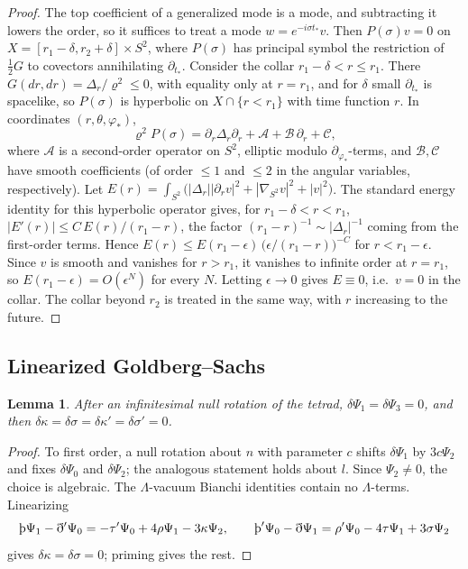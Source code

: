 \documentclass[11pt]{amsart}
\newtheorem{lemma}[theorem]{Lemma}
\theoremstyle{definition}
\theoremstyle{remark}
\numberwithin{equation}{section}
\newcommand{\Th}{\text{\th}}
\begin{document}
\begin{proof}
The top coefficient of a generalized mode is a mode, and subtracting it lowers the order, so it suffices to treat a
mode $w=e^{-i\sigma t_*}v$. Then $P(\sigma)v=0$ on $X=[r_1-\delta,r_2+\delta]\times S^2$, where $P(\sigma)$ has principal
symbol the restriction of $\frac12G$ to covectors annihilating $\partial_{t_*}$. Consider the collar $r_1-\delta<r\le r_1$.
There $G(dr,dr)=\Delta_r/\varrho^2\le0$, with equality only at $r=r_1$, and for $\delta$ small $\partial_{t_*}$ is spacelike,
so $P(\sigma)$ is hyperbolic on $X\cap\{r<r_1\}$ with time function $r$. In coordinates $(r,\theta,\varphi_*)$,
\[
\varrho^2P(\sigma)=\partial_r\Delta_r\partial_r+\mathcal A+\mathcal B\,\partial_r+\mathcal C,
\]
where $\mathcal A$ is a second-order operator on $S^2$, elliptic modulo $\partial_{\varphi_*}$-terms, and $\mathcal B,\mathcal C$
have smooth coefficients (of order $\le1$ and $\le2$ in the angular variables, respectively). Let
$E(r)=\int_{S^2}\big(|\Delta_r||\partial_rv|^2+|\nabla_{S^2}v|^2+|v|^2\big)$. The standard energy identity for this
hyperbolic operator gives, for $r_1-\delta<r<r_1$,
$|E'(r)|\le C\,E(r)/(r_1-r)$, the factor $(r_1-r)^{-1}\sim|\Delta_r|^{-1}$ coming from the first-order terms. Hence
$E(r)\le E(r_1-\epsilon)\,\big(\epsilon/(r_1-r)\big)^{-C}$ for $r<r_1-\epsilon$. Since $v$ is smooth and vanishes for
$r>r_1$, it vanishes to infinite order at $r=r_1$, so $E(r_1-\epsilon)=O(\epsilon^N)$ for every $N$. Letting
$\epsilon\to0$ gives $E\equiv0$, i.e.\ $v=0$ in the collar. The collar beyond $r_2$ is treated in the same way, with
$r$ increasing to the future.
\end{proof}

\subsection{Linearized Goldberg--Sachs}
\begin{lemma}\label{lem:GS}
After an infinitesimal null rotation of the tetrad, $\delta\Psi_1=\delta\Psi_3=0$, and then
$\delta\kappa=\delta\sigma=\delta\kappa'=\delta\sigma'=0$.
\end{lemma}
\begin{proof}
To first order, a null rotation about $n$ with parameter $c$ shifts $\delta\Psi_1$ by $3c\Psi_2$ and fixes
$\delta\Psi_0$ and $\delta\Psi_2$; the analogous statement holds about $l$. Since $\Psi_2\ne0$, the choice is
algebraic. The $\Lambda$-vacuum Bianchi identities contain no $\Lambda$-terms. Linearizing
\[
\Th\Psi_1-\eth'\Psi_0=-\tau'\Psi_0+4\rho\Psi_1-3\kappa\Psi_2,\qquad
\Th'\Psi_0-\eth\Psi_1=\rho'\Psi_0-4\tau\Psi_1+3\sigma\Psi_2
\]
gives $\delta\kappa=\delta\sigma=0$; priming gives the rest.
\end{proof}
\end{document}
